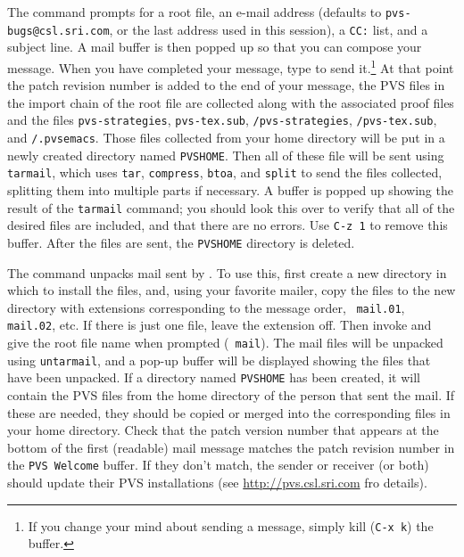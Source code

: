 The  command prompts for a root file, an e-mail
address (defaults to \texttt{pvs-bugs@csl.sri.com}, or the last address
used in this session), a \texttt{CC:} list, and a subject line.  A mail
buffer is then popped up so that you can compose your message.  When you
have completed your message, type  to send it.\footnote{If
you change your mind about sending a message, simply kill (\texttt{C-x
k}) the  buffer.}  At that point the patch revision number
is added to the end of your message, the PVS files in the import chain of
the root file are collected along with the associated proof files and the
files \texttt{pvs-strategies}, \texttt{pvs-tex.sub},
\texttt{/pvs-strategies}, \texttt{/pvs-tex.sub},
and \texttt{/.pvsemacs}.  Those files collected from your
home directory will be put in a newly created directory named
\texttt{PVSHOME}.  Then all of these file will be sent using
\texttt{tarmail}, which uses \texttt{tar}, \texttt{compress},
\texttt{btoa}, and \texttt{split} to send the files collected, splitting
them into multiple parts if necessary.  A buffer is popped up showing the
result of the \texttt{tarmail} command; you should look this over to
verify that all of the desired files are included, and that there are no
errors.  Use \texttt{C-z 1} to remove this buffer.  After the files are
sent, the \texttt{PVSHOME} directory is deleted.

The  command unpacks mail sent by
.  To use this, first create a new directory in which
to install the files, and, using your favorite mailer, copy the files to
the new directory with extensions corresponding to the message order, \eg\
\texttt{mail.01}, \texttt{mail.02}, etc.  If there is just one file, leave
the extension off.  Then invoke \ecmd{rmail-pvs-files} and give the root
file name when prompted (\eg\ \texttt{mail}).  The mail files will be
unpacked using \texttt{untarmail}, and a pop-up buffer will be displayed
showing the files that have been unpacked.  If a directory named
\texttt{PVSHOME} has been created, it will contain the PVS files from the
home directory of the person that sent the mail.  If these are needed,
they should be copied or merged into the corresponding files in your home
directory.  Check that the patch version number that appears at the bottom
of the first (readable) mail message matches the patch revision number in
the \texttt{PVS Welcome} buffer.  If they don't match, the sender or
receiver (or both) should update their PVS installations (see
\url{http://pvs.csl.sri.com} fro details).


